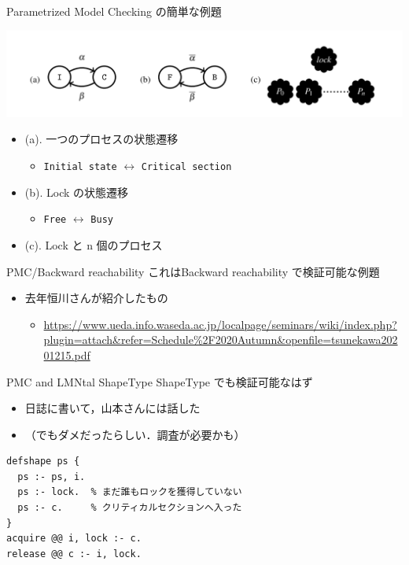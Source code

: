 \documentclass[presentation, xetex]{beamer}
\begin{document}
\begin{frame}[label={sec:orgf82b670},fragile]{Parametrized Model Checking の簡単な例題}
 \begin{center}
\includegraphics[width=.9\linewidth]{./images/simple-mutex.png}
\end{center}

\begin{itemize}
\item (a). 一つのプロセスの状態遷移
\begin{itemize}
\item \texttt{Initial state} \(\longleftrightarrow\) \texttt{Critical section}
\end{itemize}
\item (b). Lock の状態遷移
\begin{itemize}
\item \texttt{Free} \(\longleftrightarrow\) \texttt{Busy}
\end{itemize}
\item (c). Lock と n 個のプロセス
\end{itemize}
\end{frame}



\begin{frame}[label={sec:org990901c}]{PMC/Backward reachability}
これはBackward reachability で検証可能な例題
\begin{itemize}
\item 去年恒川さんが紹介したもの
\begin{itemize}
\item \url{https://www.ueda.info.waseda.ac.jp/localpage/seminars/wiki/index.php?plugin=attach\&refer=Schedule\%2F2020Autumn\&openfile=tsunekawa20201215.pdf}
\end{itemize}
\end{itemize}
\end{frame}



\begin{frame}[label={sec:orgf88bed0},fragile]{PMC and LMNtal ShapeType}
 ShapeType でも検証可能なはず
\begin{itemize}
\item 日誌に書いて，山本さんには話した
\item （でもダメだったらしい．調査が必要かも）
\end{itemize}


\begin{verbatim}
defshape ps {
  ps :- ps, i.
  ps :- lock.  % まだ誰もロックを獲得していない
  ps :- c.     % クリティカルセクションへ入った
}
acquire @@ i, lock :- c.
release @@ c :- i, lock.
\end{verbatim}
\end{frame}
\end{document}
